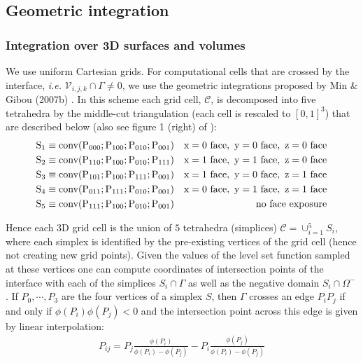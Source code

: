 \documentclass{elsarticle}
\begin{document}
\subsection{Geometric integration}
\subsubsection{Integration over 3D surfaces and volumes}
We use uniform Cartesian grids. For computational cells that are crossed by the interface, \textit{i.e.} $\mathcal{V}_{i,j,k}\cap \Gamma \neq 0$, we use the geometric integrations proposed by Min \& Gibou (2007b) \cite{min2007geometric}. In this scheme each grid cell, $\mathcal{C}$, is decomposed into five tetrahedra by the middle-cut triangulation \cite{sallee1984middle} (each cell is rescaled to $[0,1]^3$) that are described below (also see figure 1 (right) of \cite{min2007geometric}):
\begin{align*}
	 & \rm S_1 \equiv conv(P_{000} ; P_{100} ; P_{010} ; P_{001}) & \rm{ x = 0\ face,\ y = 0\ face,\ z = 0\ face} \\
	 & \rm S_2 \equiv conv(P_{110} ; P_{100} ; P_{010} ; P_{111}) & \rm{ x = 1\ face,\ y = 1\ face,\ z = 0\ face} \\
	 & \rm S_3 \equiv conv(P_{101} ; P_{100} ; P_{111} ; P_{001}) & \rm{ x = 1\ face,\ y = 0\ face,\ z = 1\ face} \\
	 & \rm S_4 \equiv conv(P_{011} ; P_{111} ; P_{010} ; P_{001}) & \rm{ x = 0\ face,\ y = 1\ face,\ z = 1\ face} \\
	 & \rm S_5\equiv conv(P_{111} ; P_{100} ; P_{010} ; P_{001})  & \rm{ no\ face\ exposure}
\end{align*}

Hence each 3D grid cell is the union of $5$ tetrahedra (simplices) $\mathcal{C}=\cup_{i=1}^5 S_i$, where each simplex is identified by the pre-existing vertices of the grid cell (hence not creating new grid points). Given the values of the level set function sampled at these vertices one can compute coordinates of intersection points of the interface with each of the simplices $S_i \cap \Gamma $ as well as the negative domain $S_i \cap \Omega^-$. If ${P_0,\cdots, P_3}$ are the four vertices of a simplex $S$, then $\Gamma$ crosses an edge $P_i P_j$ if and only if $\phi(P_i)\phi(P_j)<0$ and the intersection point across this edge is given by linear interpolation:
\begin{align*}
P_{ij}=P_j \frac{\phi(P_i)}{\phi(P_i) - \phi(P_j)} - P_i \frac{\phi(P_j)}{\phi(P_i) - \phi(P_j)}
\end{align*}
\end{document}
